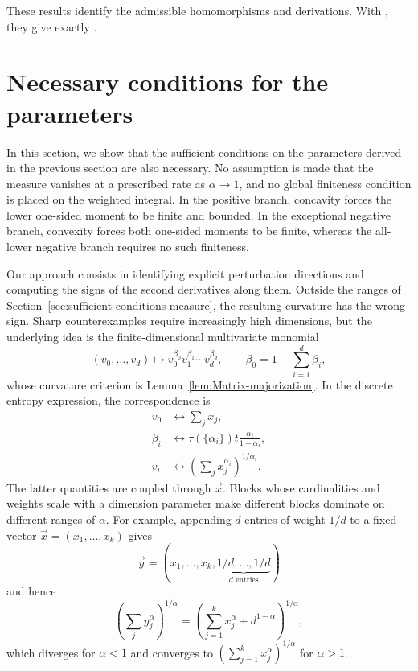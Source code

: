\documentclass[aps,pra,11pt,onecolumn,nofootinbib,tightenlines]{revtex4-2}
\theoremstyle{definition}
\begin{document}
These results identify the admissible homomorphisms and derivations.  With
\ParameterMainNormalization, they give exactly \ParameterMainFinalFamilies.

\section{Necessary conditions for the parameters}
\label{sec:necessary-conditions-measures}

In this section, we show that the sufficient conditions on the parameters derived
in the previous section are also necessary.  No assumption is made that the
measure vanishes at a prescribed rate as $\alpha\to1$, and no global finiteness
condition is placed on the weighted integral.  In the positive branch, concavity
forces the lower one-sided moment to be finite and bounded.  In the exceptional
negative branch, convexity forces both one-sided moments to be finite, whereas
the all-lower negative branch requires no such finiteness.

Our approach consists in identifying explicit perturbation directions and
computing the signs of the second derivatives along them.  Outside the ranges of
Section~\ref{sec:sufficient-conditions-measure}, the resulting curvature has the
wrong sign.  Sharp counterexamples require increasingly high dimensions, but the
underlying idea is the finite-dimensional multivariate monomial
\begin{equation}
\label{eq:multivariate-divergences-function}
 (v_0,\ldots,v_d)\longmapsto
 v_0^{\beta_0}v_1^{\beta_1}\cdots v_d^{\beta_d},
\qquad \beta_0=1-\sum_{i=1}^d\beta_i,
\end{equation}
whose curvature criterion is Lemma~\ref{lem:Matrix-majorization}.  In the
discrete entropy expression, the correspondence is
\begin{equation}
\begin{aligned}
v_0&\longleftrightarrow\sum_jx_j,\\
\beta_i&\longleftrightarrow
\tau(\{\alpha_i\})t\frac{\alpha_i}{1-\alpha_i},\\
v_i&\longleftrightarrow
\left(\sum_jx_j^{\alpha_i}\right)^{1/\alpha_i}.
\end{aligned}
\end{equation}
The latter quantities are coupled through $\vec{x}$.  Blocks whose cardinalities
and weights scale with a dimension parameter make different blocks dominate on
different ranges of $\alpha$.  For example, appending $d$ entries of weight
$1/d$ to a fixed vector $\vec{x}=(x_1,\ldots,x_k)$ gives
\[
\vec{y}=\left(
x_1,\ldots,x_k,
\underbrace{1/d,\ldots,1/d}_{d\text{ entries}}
\right)
\]
and hence
\begin{equation}
\left(\sum_jy_j^\alpha\right)^{1/\alpha}
=\left(\sum_{j=1}^k x_j^\alpha+d^{1-\alpha}\right)^{1/\alpha},
\end{equation}
which diverges for $\alpha<1$ and converges to
$(\sum_{j=1}^k x_j^\alpha)^{1/\alpha}$ for $\alpha>1$.
\end{document}
